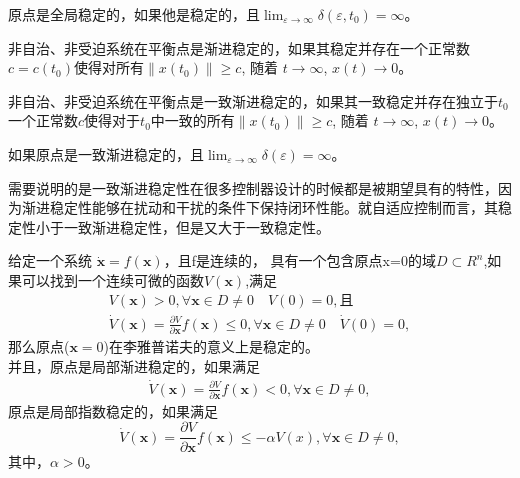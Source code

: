 \begin{defn}[全局稳定性]
原点是全局稳定的，如果他是稳定的，且$\lim_{ \varepsilon \rightarrow \infty} {\delta}(\varepsilon ,t_0)= \infty$。
\end{defn}

\begin{defn}[渐进稳定性]
非自治、非受迫系统在平衡点是渐进稳定的，如果其稳定并存在一个正常数$c=c(t_0)$使得对所有$\left \| x(t_0) \right \| \geqslant c$, 随着 $t \rightarrow \infty$, $x(t) \rightarrow 0$。
\end{defn}

\begin{defn}[一致渐进稳定性]
非自治、非受迫系统在平衡点是一致渐进稳定的，如果其一致稳定并存在独立于$t_{0}$一个正常数$c$使得对于$t_{0}$中一致的所有$\left \| x(t_0) \right \| \geqslant c$, 随着 $t \rightarrow \infty$, $x(t) \rightarrow 0$。
\end{defn}

\begin{defn}[全局一致渐进稳定性]
如果原点是一致渐进稳定的，且$\lim_{ \varepsilon \rightarrow \infty} {\delta}(\varepsilon)= \infty$。
\end{defn}

需要说明的是一致渐进稳定性在很多控制器设计的时候都是被期望具有的特性，因为渐进稳定性能够在扰动和干扰的条件下保持闭环性能。就自适应控制而言，其稳定性小于一致渐进稳定性，但是又大于一致稳定性。

\begin{thm}[李雅普诺夫直接法]
给定一个系统 $\dot{\bm x} = f(\bm x)$，且f是连续的， 具有一个包含原点x=0的域$D\subset R^n$,如果可以找到一个连续可微的函数$V(\bm x)$,满足
\begin{equation*}
    \begin{aligned}
      V(\bm x) > 0, \forall \bm x \in {D} \ne 0 \quad V(0) = 0, \text{且} \\
      \dot{V}(\bm x) = \frac{\partial V}{\partial {\bm x}} f(\bm x) \le 0, \forall \bm x \in {D} \ne 0
      \quad \dot{V}(0) = 0,
    \end{aligned}
\end{equation*}
那么原点($\bm x = 0$)在李雅普诺夫的意义上是稳定的。\\
并且，原点是局部渐进稳定的，如果满足
\begin{equation}
\begin{aligned}
\dot{V}(\bm x) = \frac{\partial V}{\partial {\bm x}} f(\bm x) < 0,
      \forall \bm x \in {D} \ne 0,
\end{aligned}
\end{equation}
原点是局部指数稳定的，如果满足
\begin{equation}
\dot{V}(\bm x) = \frac{\partial V}{\partial {\bm x}} f(\bm x)
      \le -\alpha V(x), \forall \bm x \in {D} \ne 0,
\end{equation}
其中，$\alpha>0$。
\end{thm}

